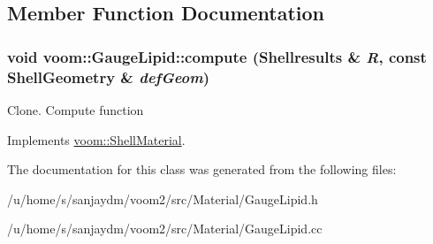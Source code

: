 \subsection{Member Function Documentation}
\hypertarget{classvoom_1_1_gauge_lipid_a6df143b4e032baa83cf98cdf00a5d739}{
\subsubsection[{compute}]{\setlength{\rightskip}{0pt plus 5cm}void voom::GaugeLipid::compute ({\bf Shellresults} \& {\em R}, \/  const {\bf ShellGeometry} \& {\em defGeom})}}
\label{classvoom_1_1_gauge_lipid_a6df143b4e032baa83cf98cdf00a5d739}


Clone. Compute function 

Implements \hyperlink{classvoom_1_1_shell_material_a959c8ad040d53a39218a7dbe6258472d}{voom::ShellMaterial}.

The documentation for this class was generated from the following files:\begin{DoxyCompactItemize}
\item 
/u/home/s/sanjaydm/voom2/src/Material/GaugeLipid.h\item 
/u/home/s/sanjaydm/voom2/src/Material/GaugeLipid.cc\end{DoxyCompactItemize}
